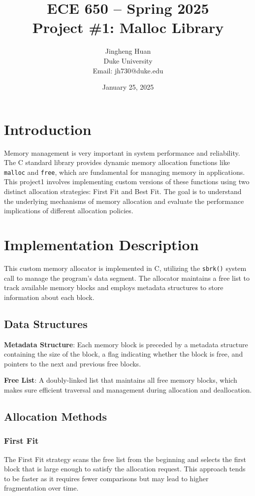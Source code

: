 \documentclass[12pt]{article}
\title{ECE 650 – Spring 2025\\Project \#1: Malloc Library\\}
\author{Jingheng Huan\\Duke University\\Email: jh730@duke.edu}
\date{January 25, 2025}
\begin{document}
\maketitle

\section{Introduction}
Memory management is very important in system performance and reliability. The C standard library provides dynamic memory allocation functions like \texttt{malloc} and \texttt{free}, which are fundamental for managing memory in applications. This project1 involves implementing custom versions of these functions using two distinct allocation strategies: First Fit and Best Fit. The goal is to understand the underlying mechanisms of memory allocation and evaluate the performance implications of different allocation policies.

\section{Implementation Description}
This custom memory allocator is implemented in C, utilizing the \texttt{sbrk()} system call to manage the program's data segment. The allocator maintains a free list to track available memory blocks and employs metadata structures to store information about each block.

\subsection{Data Structures}

\textbf{Metadata Structure}: 
Each memory block is preceded by a metadata structure containing the size of the block, a flag indicating whether the block is free, and pointers to the next and previous free blocks.

\textbf{Free List}: 
A doubly-linked list that maintains all free memory blocks, which makes sure efficient traversal and management during allocation and deallocation.

\subsection{Allocation Methods}
\subsubsection{First Fit}
The First Fit strategy scans the free list from the beginning and selects the first block that is large enough to satisfy the allocation request. This approach tends to be faster as it requires fewer comparisons but may lead to higher fragmentation over time.
\end{document}
